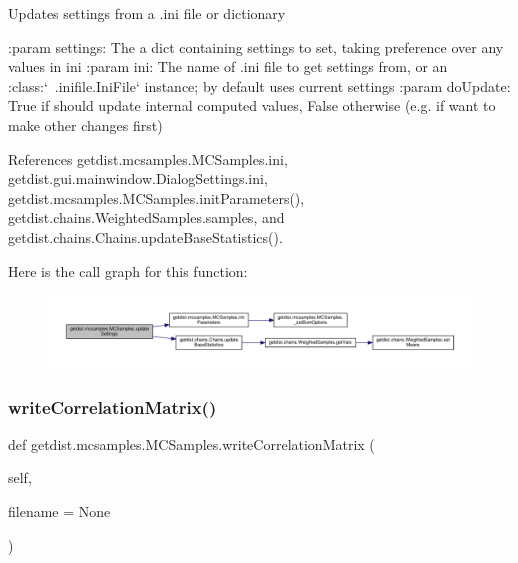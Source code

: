 \begin{DoxyVerb}Updates settings from a .ini file or dictionary

:param settings: The a dict containing settings to set, taking preference over any values in ini
:param ini: The name of .ini file to get settings from, or an :class:`~.inifile.IniFile` instance; by default uses current settings
:param doUpdate: True if should update internal computed values, False otherwise (e.g. if want to make other changes first)
\end{DoxyVerb}
 

References getdist.\+mcsamples.\+M\+C\+Samples.\+ini, getdist.\+gui.\+mainwindow.\+Dialog\+Settings.\+ini, getdist.\+mcsamples.\+M\+C\+Samples.\+init\+Parameters(), getdist.\+chains.\+Weighted\+Samples.\+samples, and getdist.\+chains.\+Chains.\+update\+Base\+Statistics().

Here is the call graph for this function\+:
\nopagebreak
\begin{figure}[H]
\begin{center}
\leavevmode
\includegraphics[width=350pt]{classgetdist_1_1mcsamples_1_1MCSamples_a772230a5fe44bf20fbc220a44563ca1c_cgraph}
\end{center}
\end{figure}
\mbox{\label{classgetdist_1_1mcsamples_1_1MCSamples_a29a520ddd47facaf90753bb81f638696}} 
\subsubsection{\texorpdfstring{write\+Correlation\+Matrix()}{writeCorrelationMatrix()}}
{\footnotesize\ttfamily def getdist.\+mcsamples.\+M\+C\+Samples.\+write\+Correlation\+Matrix (\begin{DoxyParamCaption}\item[{}]{self,  }\item[{}]{filename = {\ttfamily None} }\end{DoxyParamCaption})}

